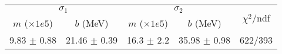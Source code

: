 \begin{tabular}{cc|cc||c}
\multicolumn{2}{c|}{$\sigma_1$} & \multicolumn{2}{|c}{$\sigma_2$}  & \multirow{2}{*}{$\chi^2/$ndf}\\
$m$ ($\times1e5$) & $b$ (MeV) & $m$ ($\times1e5$) & $b$ (MeV)  & \\
\hline
9.83 $\pm$ 0.88 & 21.46 $\pm$ 0.39 & 16.3 $\pm$ 2.2 & 35.98 $\pm$ 0.98 & 622/393\\
\end{tabular}
